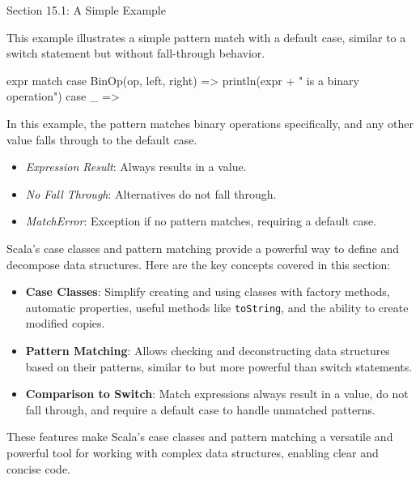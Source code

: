 \begin{notes}{Section 15.1: A Simple Example}
    \begin{highlight}
    
    This example illustrates a simple pattern match with a default case, similar to a switch statement but without fall-through behavior.
    
    \begin{code}[Scala]
    expr match {
        case BinOp(op, left, right) =>
            println(expr + " is a binary operation")
        case _ =>
    }
    \end{code}
    
    In this example, the pattern matches binary operations specifically, and any other value falls through to the default case.
    
    \begin{itemize}
        \item \textit{Expression Result}: Always results in a value.
        \item \textit{No Fall Through}: Alternatives do not fall through.
        \item \textit{MatchError}: Exception if no pattern matches, requiring a default case.
    \end{itemize}
    
    \end{highlight}
    
    \begin{highlight}
    
    Scala's case classes and pattern matching provide a powerful way to define and decompose data structures. Here are the key concepts covered in this section:
    
    \begin{itemize}
        \item \textbf{Case Classes}: Simplify creating and using classes with factory methods, automatic properties, useful methods like \texttt{toString}, and the ability to create modified copies.
        \item \textbf{Pattern Matching}: Allows checking and deconstructing data structures based on their patterns, similar to but more powerful than switch statements.
        \item \textbf{Comparison to Switch}: Match expressions always result in a value, do not fall through, and require a default case to handle unmatched patterns.
    \end{itemize}
    
    These features make Scala's case classes and pattern matching a versatile and powerful tool for working with complex data structures, enabling clear and concise code.
    
    \end{highlight}
\end{notes}

